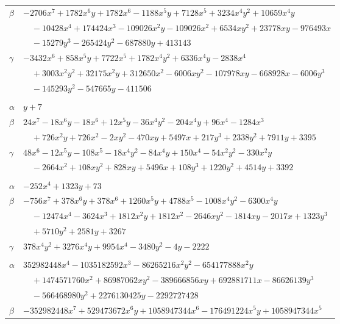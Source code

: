 \documentclass[11pt]{article}
\begin{document}
\begin{longtable}{@{}ll@{}}
$\beta$ & $-2706x^{7}+1782x^{6}y+1782x^{6}-1188x^{5}y+7128x^{5}+3234x^{4}y^{2}+10659x^{4}y$\\
 & $\quad -10428x^{4}+174424x^{3}-109026x^{2}y-109026x^{2}+6534xy^{2}+23778xy-976493x$\\
 & $\quad -15279y^{3}-265424y^{2}-687880y+413143$\\
$\gamma$ & $-3432x^{6}+858x^{5}y+7722x^{5}+1782x^{4}y^{2}+6336x^{4}y-2838x^{4}$\\
 & $\quad +3003x^{2}y^{2}+32175x^{2}y+312650x^{2}-6006xy^{2}-107978xy-668928x-6006y^{3}$\\
 & $\quad -145293y^{2}-547665y-411506$\\
\addlinespace[3pt]
\multicolumn{2}{@{}l}{$\{i,j\}=\{9,106\}$, $k_{ij}=2^{2}$}\\
$\alpha$ & $y+7$\\
$\beta$ & $24x^{7}-18x^{6}y-18x^{6}+12x^{5}y-36x^{4}y^{2}-204x^{4}y+96x^{4}-1284x^{3}$\\
 & $\quad +726x^{2}y+726x^{2}-2xy^{2}-470xy+5497x+217y^{3}+2338y^{2}+7911y+3395$\\
$\gamma$ & $48x^{6}-12x^{5}y-108x^{5}-18x^{4}y^{2}-84x^{4}y+150x^{4}-54x^{2}y^{2}-330x^{2}y$\\
 & $\quad -2664x^{2}+108xy^{2}+828xy+5496x+108y^{3}+1220y^{2}+4514y+3392$\\
\addlinespace[3pt]
\multicolumn{2}{@{}l}{$\{i,j\}=\{9,107\}$, $k_{ij}=2\cdot 5^{4}$}\\
$\alpha$ & $-252x^{4}+1323y+73$\\
$\beta$ & $-756x^{7}+378x^{6}y+378x^{6}+1260x^{5}y+4788x^{5}-1008x^{4}y^{2}-6300x^{4}y$\\
 & $\quad -12474x^{4}-3624x^{3}+1812x^{2}y+1812x^{2}-2646xy^{2}-1814xy-2017x+1323y^{3}$\\
 & $\quad +5710y^{2}+2581y+3267$\\
$\gamma$ & $378x^{4}y^{2}+3276x^{4}y+9954x^{4}-3480y^{2}-4y-2222$\\
\addlinespace[3pt]
\multicolumn{2}{@{}l}{$\{i,j\}=\{10,34\}$, $k_{ij}=3^{2}\cdot 17^{2}$}\\
$\alpha$ & $352982448x^{4}-1035182592x^{3}-86265216x^{2}y^{2}-654177888x^{2}y$\\
 & $\quad +1474571760x^{2}+86987062xy^{2}-389666856xy+692881711x-86626139y^{3}$\\
 & $\quad -566468980y^{2}+2276130425y-2292727428$\\
$\beta$ & $-352982448x^{7}+529473672x^{6}y+1058947344x^{6}-176491224x^{5}y+1058947344x^{5}$\\

\end{longtable}
\end{document}
